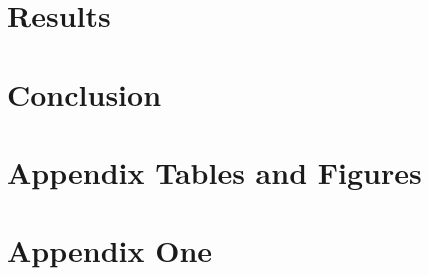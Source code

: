 \documentclass[12pt]{article}
\begin{document}
\section{Results
\label{sec:results}}

\section{Conclusion\
\label{sec:conclusion}}

\clearpage
\begin{singlespace}
%
%


\end{singlespace}


\newpage
\appendix
\setcounter{table}{0}
\renewcommand{\tablename}{Appendix Table}
\renewcommand{\figurename}{Appendix Figure}
\renewcommand{\thetable}{A\arabic{table}}
\setcounter{figure}{0}
\renewcommand{\thefigure}{A\arabic{figure}}

\section{Appendix Tables and Figures}


\newpage


\newpage 
\section{Appendix One \label{sec:appendix:first}}
\renewcommand{\thetable}{B\arabic{table}}
\setcounter{table}{0}
\renewcommand{\thefigure}{B\arabic{figure}}
\setcounter{figure}{0}
\end{document}
